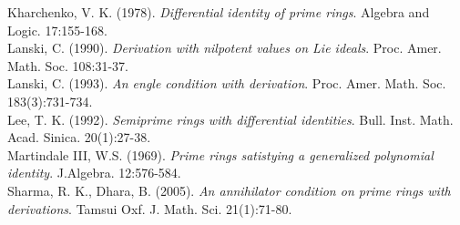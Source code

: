 \documentclass[12pt]{amsart}
\theoremstyle{definition}
\theoremstyle{remark}
\begin{document}
\begin{thebibliography}{10}
 Kharchenko, V. K. (1978).
 \emph{Differential identity of prime rings}.
 Algebra and Logic. 17:155-168.\\
 Lanski,  C. (1990).
 \emph{Derivation with nilpotent values on Lie ideals}.
 Proc. Amer. Math. Soc. 108:31-37.\\
 Lanski,  C. (1993).
 \emph{An engle condition with derivation}.
 Proc. Amer. Math. Soc. 183(3):731-734.\\
 Lee, T. K. (1992).
 \emph{Semiprime rings with differential identities}.
 Bull. Inst. Math. Acad. Sinica. 20(1):27-38.\\
 Martindale III, W.S.  (1969).
 \emph{Prime rings satistying a generalized polynomial identity}.
 J.Algebra. 12:576-584.\\
 Sharma, R. K., Dhara, B. (2005).
 \emph{An annihilator condition on prime rings with derivations}.
 Tamsui Oxf. J. Math. Sci. 21(1):71-80.\\
 \end{thebibliography}
 
\end{document}
